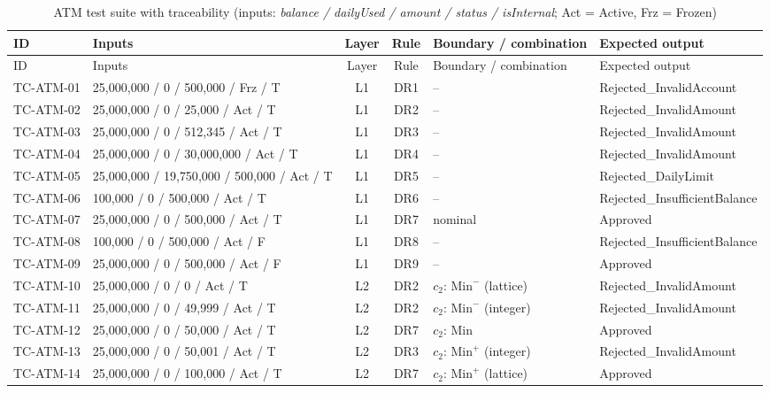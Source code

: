 \documentclass[11pt,a4paper]{article}
\begin{document}
\begingroup\small\setlength{\tabcolsep}{3pt}\renewcommand{\arraystretch}{1.12}
\begin{xltabular}{\textwidth}{@{}l L{4.2cm} c c L{2.7cm} Y@{}}
\caption{ATM test suite with traceability (inputs: \textit{balance / dailyUsed / amount / status / isInternal}; Act = Active, Frz = Frozen)} \label{tab:atm-suite}\\
\toprule
ID & Inputs & Layer & Rule & Boundary / combination & Expected output \\
\midrule
\endfirsthead
\toprule
ID & Inputs & Layer & Rule & Boundary / combination & Expected output \\
\midrule
\endhead
\bottomrule
\endfoot
TC-ATM-01 & 25{,}000{,}000 / 0 / 500{,}000 / Frz / T & L1 & DR1 & -- & Rejected\_InvalidAccount \\
TC-ATM-02 & 25{,}000{,}000 / 0 / 25{,}000 / Act / T & L1 & DR2 & -- & Rejected\_InvalidAmount \\
TC-ATM-03 & 25{,}000{,}000 / 0 / 512{,}345 / Act / T & L1 & DR3 & -- & Rejected\_InvalidAmount \\
TC-ATM-04 & 25{,}000{,}000 / 0 / 30{,}000{,}000 / Act / T & L1 & DR4 & -- & Rejected\_InvalidAmount \\
TC-ATM-05 & 25{,}000{,}000 / 19{,}750{,}000 / 500{,}000 / Act / T & L1 & DR5 & -- & Rejected\_DailyLimit \\
TC-ATM-06 & 100{,}000 / 0 / 500{,}000 / Act / T & L1 & DR6 & -- & Rejected\_InsufficientBalance \\
TC-ATM-07 & 25{,}000{,}000 / 0 / 500{,}000 / Act / T & L1 & DR7 & nominal & Approved \\
TC-ATM-08 & 100{,}000 / 0 / 500{,}000 / Act / F & L1 & DR8 & -- & Rejected\_InsufficientBalance \\
TC-ATM-09 & 25{,}000{,}000 / 0 / 500{,}000 / Act / F & L1 & DR9 & -- & Approved \\
\midrule
TC-ATM-10 & 25{,}000{,}000 / 0 / 0 / Act / T & L2 & DR2 & \(c_2\): \(\mathrm{Min}^-\) (lattice) & Rejected\_InvalidAmount \\
TC-ATM-11 & 25{,}000{,}000 / 0 / 49{,}999 / Act / T & L2 & DR2 & \(c_2\): \(\mathrm{Min}^-\) (integer) & Rejected\_InvalidAmount \\
TC-ATM-12 & 25{,}000{,}000 / 0 / 50{,}000 / Act / T & L2 & DR7 & \(c_2\): \(\mathrm{Min}\) & Approved \\
TC-ATM-13 & 25{,}000{,}000 / 0 / 50{,}001 / Act / T & L2 & DR3 & \(c_2\): \(\mathrm{Min}^+\) (integer) & Rejected\_InvalidAmount \\
TC-ATM-14 & 25{,}000{,}000 / 0 / 100{,}000 / Act / T & L2 & DR7 & \(c_2\): \(\mathrm{Min}^+\) (lattice) & Approved \\

\end{xltabular}
\end{document}
